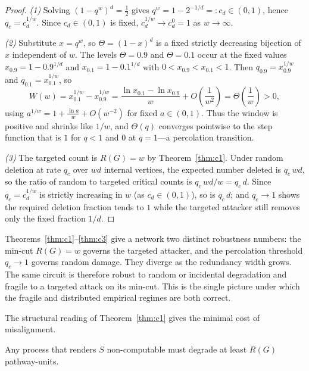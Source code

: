 \begin{proof}
\emph{(1)} Solving $(1-q^w)^d=\tfrac12$ gives $q^w=1-2^{-1/d}=:c_d\in(0,1)$, hence
$q_c=c_d^{1/w}$. Since $c_d\in(0,1)$ is fixed, $c_d^{1/w}\to c_d^0=1$ as $w\to\infty$.

\emph{(2)} Substitute $x=q^w$, so $\Theta=(1-x)^d$ is a fixed strictly decreasing
bijection of $x$ independent of $w$. The levels $\Theta=0.9$ and $\Theta=0.1$ occur at
the fixed values $x_{0.9}=1-0.9^{1/d}$ and $x_{0.1}=1-0.1^{1/d}$ with
$0<x_{0.9}<x_{0.1}<1$. Then $q_{0.9}=x_{0.9}^{1/w}$ and $q_{0.1}=x_{0.1}^{1/w}$, so
\[
  W(w)=x_{0.1}^{1/w}-x_{0.9}^{1/w}
  =\frac{\ln x_{0.1}-\ln x_{0.9}}{w}+O\!\left(\frac{1}{w^2}\right)
  =\Theta\!\left(\frac1w\right)>0,
\]
using $a^{1/w}=1+\tfrac{\ln a}{w}+O(w^{-2})$ for fixed $a\in(0,1)$. Thus the window is
positive and shrinks like $1/w$, and $\Theta(q)$ converges pointwise to the step
function that is $1$ for $q<1$ and $0$ at $q=1$---a percolation transition.

\emph{(3)} The targeted count is $R(G)=w$ by Theorem~\ref{thm:c1}. Under random
deletion at rate $q_c$ over $wd$ internal vertices, the expected number deleted is
$q_c\,wd$, so the ratio of random to targeted critical counts is
$q_c\,wd/w=q_c\,d$. Since $q_c=c_d^{1/w}$ is strictly increasing in $w$ (as
$c_d\in(0,1)$), so is $q_c\,d$; and $q_c\to1$ shows the required deletion fraction
tends to $1$ while the targeted attacker still removes only the fixed fraction
$1/d$.
\end{proof}

\begin{remark}
\label{rem:twofaces}
Theorems~\ref{thm:c1}--\ref{thm:c3} give a network two distinct robustness numbers:
the min-cut $R(G)=w$ governs the targeted attacker, and the percolation threshold
$q_c\to 1$ governs random damage. They diverge as the redundancy width grows. The same
circuit is therefore robust to random or incidental degradation and fragile to a
targeted attack on its min-cut. This is the single picture under which the fragile and
distributed empirical regimes are both correct.
\end{remark}

The structural reading of Theorem~\ref{thm:c1} gives the minimal cost of misalignment.

\begin{corollary}
\label{cor:e1}
Any process that renders $S$ non-computable must degrade at least $R(G)$
pathway-units.
\end{corollary}

